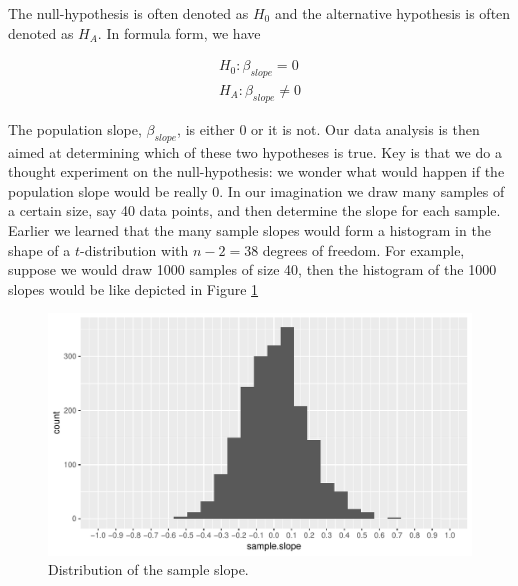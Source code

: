 \documentclass[]{book}\usepackage[]{graphicx}\usepackage[]{color}
\makeatletter
\def\maxwidth{ %
  \ifdim\Gin@nat@width>\linewidth
    \linewidth
  \else
    \Gin@nat@width
  \fi
}
\newenvironment{knitrout}{}{} %
\makeatother
\begin{document}
The null-hypothesis is often denoted as $H_0$ and the alternative hypothesis is often denoted as $H_A$. In formula form, we have


\begin{eqnarray}
H_0: \beta_{slope}=0 \\
H_A: \beta_{slope} \neq 0
\end{eqnarray}

The population slope, $\beta_{slope}$, is either 0 or it is not. Our data analysis is then aimed at determining which of these two hypotheses is true. Key is that we do a thought experiment on the null-hypothesis: we wonder what would happen if the population slope would be really 0. In our imagination we draw many samples of a certain size, say 40 data points, and then determine the slope for each sample. Earlier we learned that the many sample slopes would form a histogram in the shape of a $t$-distribution with $n-2=38$ degrees of freedom. For example, suppose we would draw 1000 samples of size 40, then the histogram of the 1000 slopes would be like depicted in Figure \ref{fig:inf_14}

\begin{knitrout}
\color{fgcolor}\begin{figure}

{\centering \includegraphics[width=\maxwidth]{figure/inf_14-1} 

}

\caption[Distribution of the sample slope]{Distribution of the sample slope.}\label{fig:inf_14}
\end{figure}


\end{knitrout}
\end{document}
